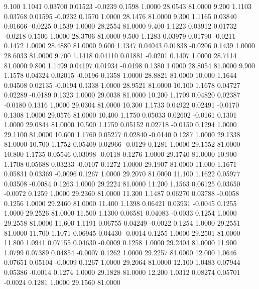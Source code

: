    9.100   1.1041   0.03700   0.01523  -0.0239   0.1598   1.0000  28.0543  81.0000
   9.200   1.1103   0.03768   0.01595  -0.0232   0.1570   1.0000  28.1476  81.0000
   9.300   1.1165   0.03840   0.01666  -0.0225   0.1539   1.0000  28.2554  81.0000
   9.400   1.1223   0.03912   0.01732  -0.0218   0.1506   1.0000  28.3706  81.0000
   9.500   1.1283   0.03979   0.01790  -0.0211   0.1472   1.0000  28.4880  81.0000
   9.600   1.1347   0.04043   0.01838  -0.0206   0.1439   1.0000  28.6033  81.0000
   9.700   1.1418   0.04110   0.01881  -0.0201   0.1407   1.0000  28.7114  81.0000
   9.800   1.1499   0.04197   0.01934  -0.0198   0.1380   1.0000  28.8054  81.0000
   9.900   1.1578   0.04324   0.02015  -0.0196   0.1358   1.0000  28.8821  81.0000
  10.000   1.1644   0.04508   0.02135  -0.0194   0.1338   1.0000  28.9521  81.0000
  10.100   1.1678   0.04727   0.02289  -0.0189   0.1323   1.0000  29.0038  81.0000
  10.200   1.1709   0.04820   0.02387  -0.0180   0.1316   1.0000  29.0304  81.0000
  10.300   1.1733   0.04922   0.02491  -0.0170   0.1308   1.0000  29.0576  81.0000
  10.400   1.1750   0.05033   0.02602  -0.0161   0.1301   1.0000  29.0844  81.0000
  10.500   1.1759   0.05152   0.02718  -0.0150   0.1294   1.0000  29.1100  81.0000
  10.600   1.1760   0.05277   0.02840  -0.0140   0.1287   1.0000  29.1338  81.0000
  10.700   1.1752   0.05409   0.02966  -0.0129   0.1281   1.0000  29.1552  81.0000
  10.800   1.1735   0.05546   0.03098  -0.0118   0.1276   1.0000  29.1740  81.0000
  10.900   1.1708   0.05688   0.03233  -0.0107   0.1272   1.0000  29.1907  81.0000
  11.000   1.1671   0.05831   0.03369  -0.0096   0.1267   1.0000  29.2070  81.0000
  11.100   1.1622   0.05977   0.03508  -0.0084   0.1263   1.0000  29.2224  81.0000
  11.200   1.1563   0.06125   0.03650  -0.0072   0.1259   1.0000  29.2360  81.0000
  11.300   1.1487   0.06270   0.03788  -0.0058   0.1256   1.0000  29.2460  81.0000
  11.400   1.1398   0.06421   0.03931  -0.0045   0.1255   1.0000  29.2526  81.0000
  11.500   1.1300   0.06581   0.04083  -0.0033   0.1254   1.0000  29.2558  81.0000
  11.600   1.1191   0.06755   0.04249  -0.0022   0.1254   1.0000  29.2551  81.0000
  11.700   1.1071   0.06945   0.04430  -0.0014   0.1255   1.0000  29.2501  81.0000
  11.800   1.0941   0.07155   0.04630  -0.0009   0.1258   1.0000  29.2404  81.0000
  11.900   1.0799   0.07389   0.04854  -0.0007   0.1262   1.0000  29.2257  81.0000
  12.000   1.0646   0.07651   0.05104  -0.0009   0.1267   1.0000  29.2064  81.0000
  12.100   1.0483   0.07944   0.05386  -0.0014   0.1274   1.0000  29.1828  81.0000
  12.200   1.0312   0.08274   0.05701  -0.0024   0.1281   1.0000  29.1560  81.0000
